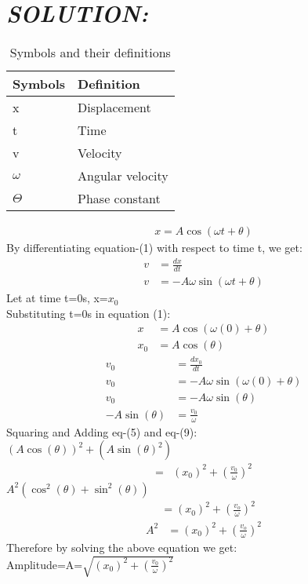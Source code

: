 \documentclass[journal,12pt,twocolumn]{IEEEtran}
\theoremstyle{remark}
\begin{document}
\section{\textit{SOLUTION:}}
\begin{table}[htbp]
    \centering
    \def\arraystretch{1.5}
    \begin{tabular}{|p{2cm}|p{2cm}|}
    \hline
    Symbols&Definition \\  \hline
    x&Displacement \\  \hline
    t&Time \\ \hline
    v&Velocity \\ \hline
    $\omega$&Angular velocity \\  \hline
    $\Theta$&Phase constant \\  \hline
    \end{tabular}
    \caption{Symbols and their definitions}
    \label{tab:Table1}
\end{table}    
\begin{align}    
x=A\cos(\omega{t}+\theta)\end{align}
By differentiating equation-(1) with respect to time t,
we get:
\begin{align}
v&=\frac{dx}{dt}\\
v&=-A\omega{}\sin(\omega{t}+\theta{})  
\end{align}
Let at time t=0s, x=$x_0$\\
Substituting t=0s in equation (1):
\begin{align}
x&=A\cos(\omega{(0)}+\theta{})\\
x_0&=A\cos(\theta{})
\end{align}
\begin{align}
v_0&=\frac{dx_0}{dt}\\
v_0&=-A\omega{}\sin(\omega{(0)}+\theta{})\\
v_0&=-A\omega{}\sin(\theta{})\\
-A\sin(\theta{})&=\frac{v_0}{\omega{}}
\end{align}
Squaring and Adding eq-(5) and eq-(9):\\
$(A\cos(\theta{}))^2+(A\sin(\theta{})^2)$
\begin{align}
=&(x_0)^2+(\frac{v_0}{\omega{}})^2\end{align}
$A^2(\cos^2(\theta{})+\sin^2(\theta{}))$
\begin{align}
&=(x_0)^2+(\frac{v_o}{\omega{}})^2\end{align}
\begin{align}
A^2&=(x_0)^2+(\frac{v_o}{\omega{}})^2\end{align}
Therefore by solving the above equation we get:\\
\LARGE{Amplitude=A=$\sqrt{(x_0)^2+(\frac{v_0}{\omega{}})^2}$}
\end{document}

